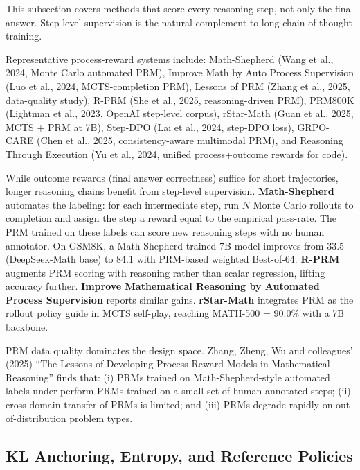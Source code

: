 \documentclass{article}
\begin{document}
This subsection covers methods that score every reasoning step, not only the final answer. Step-level supervision is the natural complement to long chain-of-thought training.

Representative process-reward systems include: Math-Shepherd (Wang et al., 2024, Monte Carlo automated PRM), Improve Math by Auto Process Supervision (Luo et al., 2024, MCTS-completion PRM), Lessons of PRM (Zhang et al., 2025, data-quality study), R-PRM (She et al., 2025, reasoning-driven PRM), PRM800K (Lightman et al., 2023, OpenAI step-level corpus), rStar-Math (Guan et al., 2025, MCTS + PRM at 7B), Step-DPO (Lai et al., 2024, step-DPO loss), GRPO-CARE (Chen et al., 2025, consistency-aware multimodal PRM), and Reasoning Through Execution (Yu et al., 2024, unified process+outcome rewards for code).

While outcome rewards (final answer correctness) suffice for short trajectories, longer reasoning chains benefit from step-level supervision. \textbf{Math-Shepherd} \citep{wang20242024} automates the labeling: for each intermediate step, run \(N\) Monte Carlo rollouts to completion and assign the step a reward equal to the empirical pass-rate. The PRM trained on these labels can score new reasoning steps with no human annotator. On GSM8K, a Math-Shepherd-trained 7B model improves from 33.5 (DeepSeek-Math base) to 84.1 with PRM-based weighted Best-of-64. \textbf{R-PRM} \citep{she20252025} augments PRM scoring with reasoning rather than scalar regression, lifting accuracy further. \textbf{Improve Mathematical Reasoning by Automated Process Supervision} \citep{luo20242024} reports similar gains. \textbf{rStar-Math} \citep{guan20252025} integrates PRM as the rollout policy guide in MCTS self-play, reaching MATH-500 = 90.0\% with a 7B backbone.

PRM data quality dominates the design space. Zhang, Zheng, Wu and colleagues' (2025) ``The Lessons of Developing Process Reward Models in Mathematical Reasoning'' finds that: (i) PRMs trained on Math-Shepherd-style automated labels under-perform PRMs trained on a small set of human-annotated steps; (ii) cross-domain transfer of PRMs is limited; and (iii) PRMs degrade rapidly on out-of-distribution problem types.

\subsection{KL Anchoring, Entropy, and Reference Policies}\label{kl-anchoring-entropy-and-reference-policies}
\end{document}
